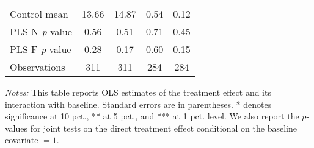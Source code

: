 \begin{table}[ht]
{\begin{threeparttable}
\begin{tabular}{l*{4}{c}}
Control mean    &    13.66         &    14.87         &     0.54         &     0.12         \\
PLS-N \emph{p}-value&     0.56         &     0.51         &     0.71         &     0.45         \\
PLS-F \emph{p}-value&     0.28         &     0.17         &     0.60         &     0.15         \\
Observations    &      311         &      311         &      284         &      284         \\
\bottomrule \end{tabular} \begin{tablenotes}[flushleft] \footnotesize \item \emph{Notes:} This table reports OLS estimates of the treatment effect and its interaction with baseline. Standard errors are in parentheses. * denotes significance at 10 pct., ** at 5 pct., and *** at 1 pct. level. We also report the \(p\)-values for joint tests on the direct treatment effect conditional on the baseline covariate $= 1$. \end{tablenotes} \end{threeparttable} } \end{table}

